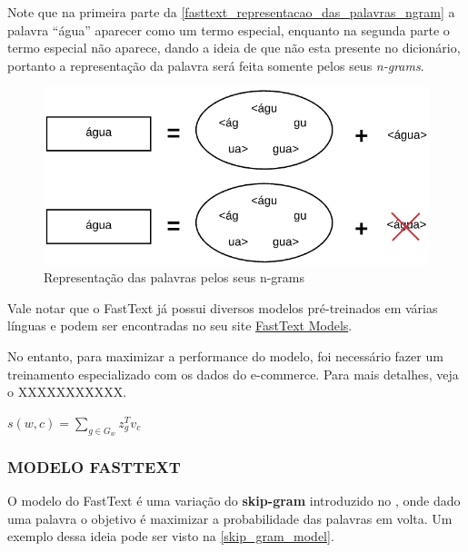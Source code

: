 Note que na primeira parte da \autoref{fasttext_representacao_das_palavras_ngram} a palavra “água” aparecer como um termo especial, enquanto na segunda parte o termo especial não aparece, dando a ideia de que não esta presente no dicionário, portanto a representação da palavra será feita somente pelos seus \textit{n-grams}.

\begin{figure}[htb]
	\caption{\label{fasttext_representacao_das_palavras_ngram} Representação das palavras pelos seus n-grams}
	\begin{center}
	    \includegraphics[scale=0.5]{artigo/recursos/imagens/fasttext_representacao_das_palavras_ngram.png}
	\end{center}
\end{figure}

Vale notar que o FastText já possui diversos modelos pré-treinados em várias línguas e podem ser encontradas no seu site \href{https://fasttext.cc/docs/en/english-vectors.html}{FastText Models}.

No entanto, para maximizar a performance do modelo, foi necessário fazer um treinamento especializado com os dados do e-commerce. Para mais detalhes, veja o XXXXXXXXXXX.


\begin{center}\large
    $s(w, c) = \sum_{g \in G_w} z_{g}^{T} v_c$
\end{center}

\subsubsection{MODELO FASTTEXT}

O modelo do FastText é uma variação do \textbf{skip-gram} introduzido no \cite{mikolov}, onde dado uma palavra o objetivo é maximizar a probabilidade das palavras em volta. Um exemplo dessa ideia pode ser visto na \autoref{skip_gram_model}.

